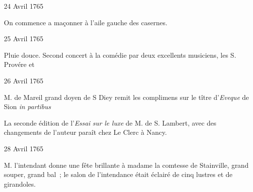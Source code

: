                      
                     \begin{diary}{24 Avril 1765}{}
                        
                         On commence a maçonner à l'aile
                           gauche
                           des casernes. \bigskip
        
        
                     \end{diary}

                     \begin{diary}{25 Avril 1765}{}
                        
                        
                           Pluie douce. Second concert à la
                              comédie
                           par deux excellents musiciens, les S.
                              Provére et 
                        \bigskip
        
        
                     \end{diary}

                     \begin{diary}{26 Avril 1765}{}
                        
                        
                           M. de Mareil
                           grand doyen de S Diey remit
                           les complimens sur le tître d'\emph{Eveque} de
                           Sion
                           \emph{in partibus}
                        \bigskip
        
        
                         La seconde édition de l'\emph{Essai sur le luxe} de
                           M. de S.
                              Lambert,
                           avec des changements de
                           l'auteur paraît chez
                           Le Clerc à Nancy. \bigskip
        
        
                     \end{diary}

                     \begin{diary}{28 Avril 1765}{}
                        
                        
                           M. l'intendant donne une fête
                           brillante
                           à madame la comtesse de Stainville, grand souper,
                           grand bal ; le salon de l'intendance était
                           éclairé de cinq lustres et de girandoles. \bigskip
        
        
                     \end{diary}

